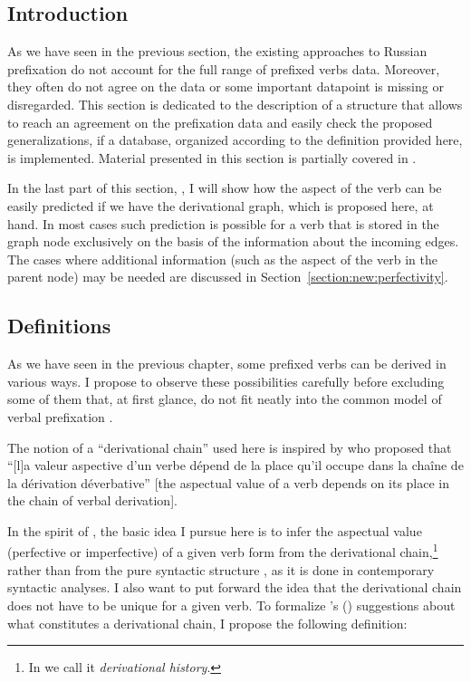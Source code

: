 \subsection{Introduction}
As we have seen in the previous section, the existing approaches to Russian prefixation  do not account for the full range of prefixed verbs data. Moreover, they often do not agree on the data or some important datapoint is missing or disregarded. This section is dedicated to the description of a structure that allows to reach an agreement on the prefixation  data and easily check the proposed generalizations, if a database, organized according to the definition provided here, is implemented. Material presented in this section is partially covered in \citet{ZinovaFilip:14b}.

In the last part of this section, , I will show how the aspect of the verb can be easily predicted if we have the derivational graph, which is proposed here, at hand. In most cases such prediction is possible for a verb that is stored in the graph node exclusively on the basis of the information about the incoming edges. The cases where additional information (such as the aspect of the verb in the parent node) may be needed are discussed in Section~\ref{section:new:perfectivity}.

\subsection{Definitions}\label{section:chains:definition}
As we have seen in the previous chapter, some prefixed verbs can be derived in various ways. I propose to observe these possibilities carefully before excluding some of them that, at first glance, do not fit neatly into the common model of verbal prefixation .

The notion of a ``derivational chain'' used here is inspired by \citet{Karcevski:27} who proposed that ``[l]a valeur aspective d'un verbe d\'{e}pend de la place qu'il occupe dans la cha\^{i}ne de la d\'{e}rivation d\'{e}verbative'' [the aspectual value of a verb depends on its place in the chain of verbal derivation].

In the spirit of \citet{Karcevski:27}, the basic idea I pursue here is to infer the aspectual value (perfective or imperfective) of a given verb form from the derivational chain,\footnote{In \citet{ZinovaFilip:14b} we call it \textit{derivational history}.} rather than from the pure syntactic structure , as it is done in contemporary syntactic analyses. I also want to put forward the idea that the derivational chain does not have to be unique for a given verb. To formalize \citeauthor{Karcevski:27}'s (\citeyear{Karcevski:27}) suggestions about what constitutes a derivational chain, I propose the following definition:

